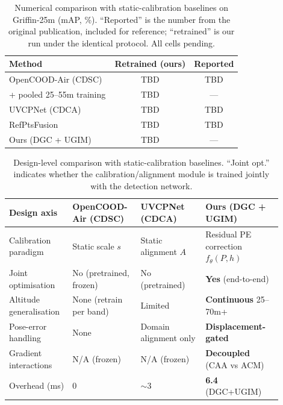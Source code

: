 \documentclass[9.5pt,twocolumn,a4paper]{IEEEtran}
\begin{document}
\begin{table}[htbp]
    \centering
    \small
    \caption{Numerical comparison with static-calibration baselines on Griffin-25m (mAP, \%). ``Reported'' is the number from the original publication, included for reference; ``retrained'' is our run under the identical protocol. All cells pending.}
    \begin{tabular}{l|cc}
        \toprule
        Method & Retrained (ours) & Reported \\
        \midrule
        OpenCOOD-Air (CDSC)~\cite{opencood_air} & TBD & TBD \\
        \quad + pooled 25--55m training         & TBD & --- \\
        UVCPNet (CDCA)~\cite{uvcpnet}           & TBD & TBD \\
        RefPtsFusion~\cite{refptsfusion}        & TBD & TBD \\
        \midrule
        Ours (DGC + UGIM)                        & TBD & --- \\
        \bottomrule
    \end{tabular}
    \label{tab:static_numeric}
\end{table}

\begin{table}[htbp]
    \centering
    \small
    \caption{Design-level comparison with static-calibration baselines. ``Joint opt.'' indicates whether the calibration/alignment module is trained jointly with the detection network.}
    \begin{tabular}{p{0.20\linewidth} p{0.22\linewidth} p{0.22\linewidth} p{0.26\linewidth}}
        \toprule
        \textbf{Design axis} & \textbf{OpenCOOD-Air (CDSC)} & \textbf{UVCPNet (CDCA)} & \textbf{Ours (DGC + UGIM)} \\
        \midrule
        Calibration paradigm     & Static scale $s$             & Static alignment $A$    & Residual PE correction $f_\theta(P, h)$ \\
        Joint optimisation       & No (pretrained, frozen)      & No (pretrained)          & \textbf{Yes} (end-to-end) \\
        Altitude generalisation  & None (retrain per band)      & Limited                  & \textbf{Continuous} 25--70m+ \\
        Pose-error handling      & None                         & Domain alignment only    & \textbf{Displacement-gated} \\
        Gradient interactions    & N/A (frozen)                 & N/A (frozen)             & \textbf{Decoupled} (CAA vs ACM) \\
        Overhead (ms)            & 0                            & $\sim$3                  & \textbf{6.4} (DGC+UGIM) \\
        \bottomrule
    \end{tabular}
    \label{tab:design_comparison}
\end{table}
\end{document}
